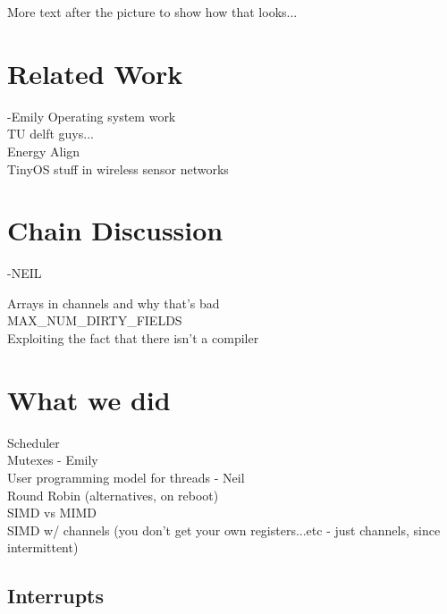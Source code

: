 \documentclass[11pt]{sensys-proc}
\begin{document}
More text after the picture to show how that looks...


\section{Related Work} -Emily
Operating system work\\
TU delft guys...\\
Energy Align\\
TinyOS stuff in wireless sensor networks\\

\section{Chain Discussion} -NEIL

Arrays in channels and why that's bad\\
MAX\_NUM\_DIRTY\_FIELDS\\
Exploiting the fact that there isn't a compiler\\


\section{What we did} %
Scheduler\\
Mutexes - Emily\\
User programming model for threads - Neil\\
Round Robin (alternatives, on reboot)\\
SIMD vs MIMD\\
SIMD w/ channels (you don't get your own registers...etc -
    just channels, since intermittent)\\

\subsection{Interrupts}
\end{document}
